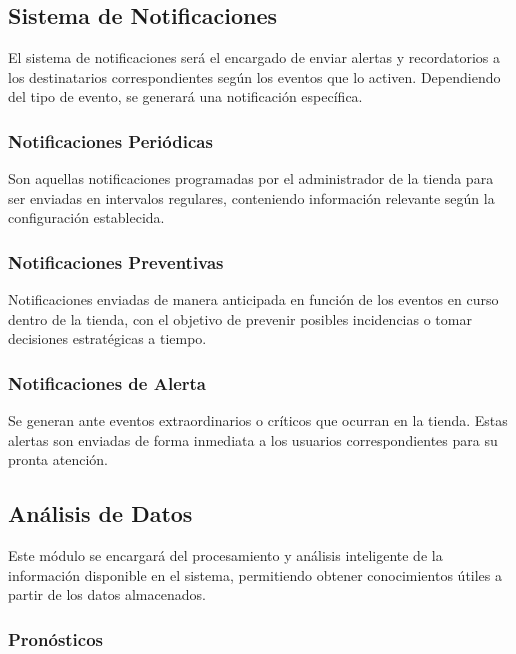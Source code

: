 \subsection{Sistema de Notificaciones}

El sistema de notificaciones será el encargado de enviar alertas y recordatorios a los destinatarios correspondientes según los eventos que lo activen. Dependiendo del tipo de evento, se generará una notificación específica.

\subsubsection{Notificaciones Periódicas}

Son aquellas notificaciones programadas por el administrador de la tienda para ser enviadas en intervalos regulares, conteniendo información relevante según la configuración establecida.

\subsubsection{Notificaciones Preventivas}

Notificaciones enviadas de manera anticipada en función de los eventos en curso dentro de la tienda, con el objetivo de prevenir posibles incidencias o tomar decisiones estratégicas a tiempo.

\subsubsection{Notificaciones de Alerta}

Se generan ante eventos extraordinarios o críticos que ocurran en la tienda. Estas alertas son enviadas de forma inmediata a los usuarios correspondientes para su pronta atención.

\subsection{Análisis de Datos}

Este módulo se encargará del procesamiento y análisis inteligente de la información disponible en el sistema, permitiendo obtener conocimientos útiles a partir de los datos almacenados.

\subsubsection{Pronósticos}

